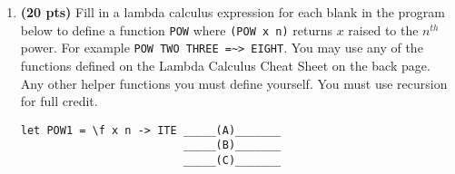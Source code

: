 \documentclass[paper=letter, fontsize=13pt]{article} %
\numberwithin{equation}{section} %
\begin{document}
\begin{enumerate}
{\Large
\verb|(\x y z -> y x z) (\x -> x x a) (\y z -> z y) (\y -> y y b)|
}

\begin{enumerate}[label=(\Alph*)]
\item \textbf{(5 pts)}
  Which variables are \textbf{bound} in the above expression?
\begin{enumerate}[label=(\alph*), itemsep=1em]
\item All occurrences of "a" and "b"
\item All occurrences of "x", "y" and "z"  %
\item All occurrences of "a", "b", "x", "y" and "z"
\item The first occurrences of "x", "y" and "z"
\item All but the first occurrences of "x", "y" and "z"
\end{enumerate}

\bigskip
\bigskip
\bigskip
\bigskip
\bigskip
\bigskip

\item \textbf{(10 pts)} Which of the following expressions can be obtained from the above expression with one or more beta reductions?
\begin{enumerate}[label=(\alph*), itemsep=1em]
\item \verb|(\a -> a (\x -> x x a)) (\y -> y y b)| %
\item \verb|(\x -> x x a) (\y -> y y b)|                     %
\item \verb|(\x -> x x a) (\y -> y y b) a b a b a|
\item \verb|(\x -> x x a) (\x -> x x a) a a a a b| %
\item \verb|(\y -> y y b) (\y -> y y b) b b b b a|
\end{enumerate}

\end{enumerate}

\newpage

\item \textbf{(20 pts)}
  Fill in a lambda calculus expression for each blank in the program
below to define a function \verb|POW| where \verb|(POW x n)| returns 
$x$ raised to the $n^{th}$ power.  For example \verb|POW TWO THREE =~> EIGHT|.
You may use any of the functions defined on the Lambda
Calculus Cheat Sheet on the back page.  Any other helper functions you
must define yourself.  You must use recursion for full credit.

\begin{verbatim}
let POW1 = \f x n -> ITE _____(A)_______
                         _____(B)_______
                         _____(C)_______
                      

\end{verbatim}
\end{enumerate}
\end{document}

